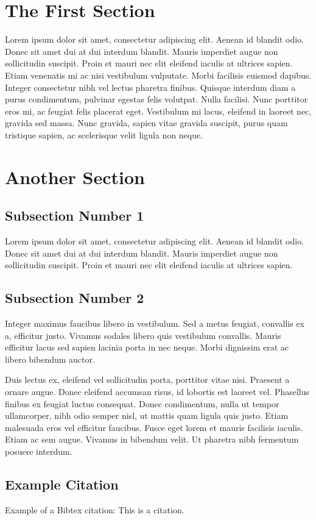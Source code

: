\documentclass[11pt,a4paper]{proc} %
\begin{document}
\section{The First Section}

Lorem ipsum dolor sit amet, consectetur adipiscing elit. Aenean id blandit odio. Donec sit amet dui at dui interdum blandit. Mauris imperdiet augue non sollicitudin suscipit. Proin et mauri nec elit eleifend iaculis at ultrices sapien. Etiam venenatis mi ac nisi vestibulum vulputate. Morbi facilisis euismod dapibus. Integer consectetur nibh vel lectus pharetra finibus. Quisque interdum diam a purus condimentum, pulvinar egestas felis volutpat. Nulla facilisi. Nunc porttitor eros mi, ac feugiat felis placerat eget. Vestibulum mi lacus, eleifend in laoreet nec, gravida sed massa. Nunc gravida, sapien vitae gravida suscipit, purus quam tristique sapien, ac scelerisque velit ligula non neque.

\section{Another Section}

\subsection{Subsection Number 1}
Lorem ipsum dolor sit amet, consectetur adipiscing elit. Aenean id blandit odio. Donec sit amet dui at dui interdum blandit. Mauris imperdiet augue non sollicitudin suscipit. Proin et mauri nec elit eleifend iaculis at ultrices sapien.
\subsection{Subsection Number 2}
Integer maximus faucibus libero in vestibulum. Sed a metus feugiat, convallis ex a, efficitur justo. Vivamus sodales libero quis vestibulum convallis. Mauris efficitur lacus sed sapien lacinia porta in nec neque. Morbi dignissim erat ac libero bibendum auctor.

Duis lectus ex, eleifend vel sollicitudin porta, porttitor vitae nisi. Praesent a ornare augue. Donec eleifend accumsan risus, id lobortis est laoreet vel. Phasellus finibus ex feugiat luctus consequat. Donec condimentum, nulla ut tempor ullamcorper, nibh odio semper nisl, ut mattis quam ligula quis justo. Etiam malesuada eros vel efficitur faucibus. Fusce eget lorem et mauris facilisis iaculis. Etiam ac sem augue. Vivamus in bibendum velit. Ut pharetra nibh fermentum posuere interdum.

\subsection{Example Citation}
Example of a Bibtex citation: This is a \cite{Jurafsky:Martin:09} citation.






\end{document}
